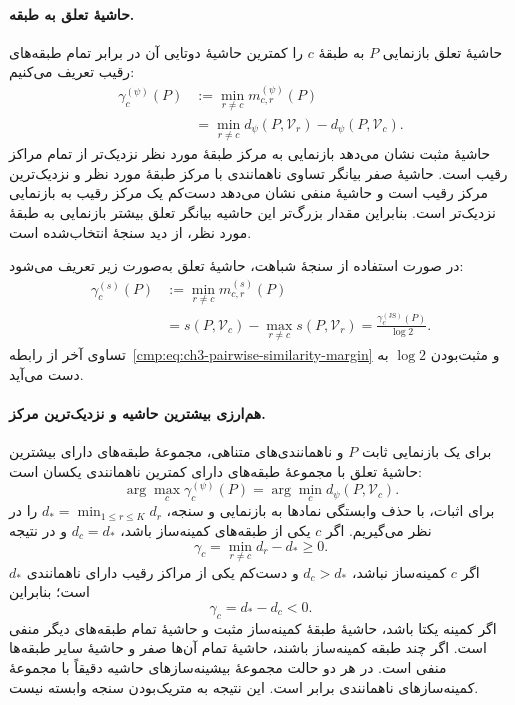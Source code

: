 \paragraph{حاشیهٔ تعلق به طبقه.}
حاشیهٔ تعلق بازنمایی $P$ به طبقهٔ $c$ را کمترین
حاشیهٔ دوتایی آن در برابر تمام طبقه‌های رقیب تعریف می‌کنیم:
\begin{equation}\label{cmp:eq:ch3-fixed-representation-margin}
\boxed{\begin{aligned}
\gamma_c^{(\psi)}(P)
&:=\min_{r\ne c}m_{c,r}^{(\psi)}(P)\\
&=\min_{r\ne c}d_\psi(P,\mathcal V_r)-d_\psi(P,\mathcal V_c).
\end{aligned}}
\end{equation}
حاشیهٔ مثبت نشان می‌دهد بازنمایی به مرکز طبقهٔ مورد
نظر نزدیک‌تر از تمام مراکز رقیب است. حاشیهٔ صفر
بیانگر تساوی ناهمانندی با مرکز طبقهٔ مورد نظر و
نزدیک‌ترین مرکز رقیب است و حاشیهٔ منفی نشان می‌دهد
دست‌کم یک مرکز رقیب به بازنمایی نزدیک‌تر است.
بنابراین مقدار بزرگ‌تر این حاشیه بیانگر تعلق بیشتر
بازنمایی به طبقهٔ مورد نظر، از دید سنجهٔ انتخاب‌شده است.

در صورت استفاده از سنجهٔ شباهت، حاشیهٔ تعلق به‌صورت
زیر تعریف می‌شود:
\begin{equation}\label{cmp:eq:ch3-fixed-representation-similarity-margin}
\begin{aligned}
\gamma_c^{(s)}(P)
&:=\min_{r\ne c}m_{c,r}^{(s)}(P)\\
&=s(P,\mathcal V_c)-\max_{r\ne c}s(P,\mathcal V_r)
=\frac{\gamma_c^{(\mathrm{JS})}(P)}{\log2}.
\end{aligned}
\end{equation}
تساوی آخر از رابطه~\eqref{cmp:eq:ch3-pairwise-similarity-margin}
و مثبت‌بودن $\log2$ به دست می‌آید.

\paragraph{هم‌ارزی بیشترین حاشیه و نزدیک‌ترین مرکز.}
برای یک بازنمایی ثابت $P$ و ناهمانندی‌های متناهی،
مجموعهٔ طبقه‌های دارای بیشترین حاشیهٔ تعلق با
مجموعهٔ طبقه‌های دارای کمترین ناهمانندی یکسان است:
\begin{equation}\label{cmp:eq:ch3-class-center-decision}
\boxed{\arg\max_c\gamma_c^{(\psi)}(P)
=\arg\min_c d_\psi(P,\mathcal V_c).}
\end{equation}
برای اثبات، با حذف وابستگی نمادها به بازنمایی و
سنجه، $d_*=\min_{1\le r\le K}d_r$ را در نظر می‌گیریم.
اگر $c$ یکی از طبقه‌های کمینه‌ساز باشد، $d_c=d_*$ و
در نتیجه
\[
\gamma_c=\min_{r\ne c}d_r-d_*\ge0.
\]
اگر $c$ کمینه‌ساز نباشد، $d_c>d_*$ و دست‌کم یکی از
مراکز رقیب دارای ناهمانندی $d_*$ است؛ بنابراین
\[
\gamma_c=d_*-d_c<0.
\]
اگر کمینه یکتا باشد، حاشیهٔ طبقهٔ کمینه‌ساز مثبت
و حاشیهٔ تمام طبقه‌های دیگر منفی است. اگر چند طبقه
کمینه‌ساز باشند، حاشیهٔ تمام آن‌ها صفر و حاشیهٔ
سایر طبقه‌ها منفی است. در هر دو حالت مجموعهٔ
بیشینه‌سازهای حاشیه دقیقاً با مجموعهٔ کمینه‌سازهای
ناهمانندی برابر است. این نتیجه به متریک‌بودن سنجه
وابسته نیست.

